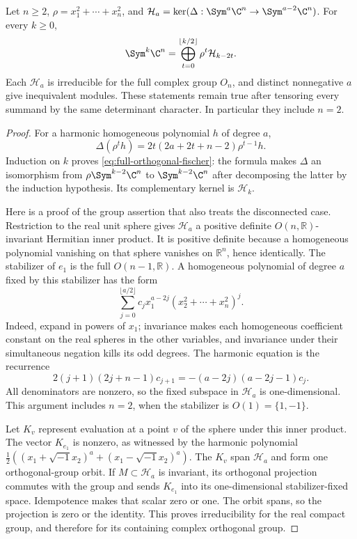 \begin{lemma}
\label{lem:full-orthogonal-harmonics}
Let \(n\ge2\), \(\rho=x_1^2+\cdots+x_n^2\), and
\(\mathcal H_a=\ker(\Delta:\Sym^a\C^n\to\Sym^{a-2}\C^n)\).
For every \(k\ge0\),
\begin{equation}\label{eq:full-orthogonal-fischer}
 \Sym^k\C^n=\bigoplus_{t=0}^{\lfloor k/2\rfloor}
                  \rho^t\mathcal H_{k-2t}.
\end{equation}
Each \(\mathcal H_a\) is irreducible for the full complex group
\(O_n\), and distinct nonnegative \(a\) give inequivalent modules.
These statements remain true after tensoring every summand by the
same determinant character.  In particular they include \(n=2\).
\end{lemma}
\begin{proof}
For a harmonic homogeneous polynomial \(h\) of degree \(a\),
\[
 \Delta(\rho^t h)=2t(2a+2t+n-2)\rho^{t-1}h.
\]
Induction on \(k\) proves \eqref{eq:full-orthogonal-fischer}:
the formula makes \(\Delta\) an isomorphism from
\(\rho\Sym^{k-2}\C^n\) to \(\Sym^{k-2}\C^n\) after decomposing
the latter by the induction hypothesis.  Its complementary kernel
is \(\mathcal H_k\).

Here is a proof of the group assertion that also treats the disconnected
case.  Restriction to the real unit sphere gives \(\mathcal H_a\) a
positive definite \(O(n,\mathbb R)\)-invariant Hermitian inner product.
It is positive definite because a homogeneous polynomial vanishing
on that sphere vanishes on \(\mathbb R^n\), hence identically.
The stabilizer of \(e_1\) is the full \(O(n-1,\mathbb R)\).
A homogeneous polynomial of degree \(a\) fixed by this stabilizer
has the form
\[
 \sum_{j=0}^{\lfloor a/2\rfloor}
 c_jx_1^{a-2j}(x_2^2+\cdots+x_n^2)^j.
\]
Indeed, expand in powers of \(x_1\); invariance makes each
homogeneous coefficient constant on the real spheres in the other
variables, and invariance under their simultaneous negation kills
its odd degrees.  The harmonic equation is the recurrence
\[
 2(j+1)(2j+n-1)c_{j+1}
       =-(a-2j)(a-2j-1)c_j.
\]
All denominators are nonzero, so the fixed subspace in
\(\mathcal H_a\) is one-dimensional.  This argument includes
\(n=2\), when the stabilizer is \(O(1)=\{1,-1\}\).

Let \(K_v\) represent evaluation at a point \(v\) of the sphere
under this inner product.  The vector \(K_{e_1}\) is nonzero,
as witnessed by the harmonic polynomial
\(\tfrac12((x_1+\sqrt{-1}x_2)^a+(x_1-\sqrt{-1}x_2)^a)\).
The \(K_v\) span \(\mathcal H_a\) and form one orthogonal-group
orbit.  If \(M\subset\mathcal H_a\) is invariant, its orthogonal
projection commutes with the group and sends \(K_{e_1}\) into its
one-dimensional stabilizer-fixed space.  Idempotence makes that
scalar zero or one.  The orbit spans, so the projection is zero or
the identity.  This proves irreducibility for the real compact group,
and therefore for its containing complex orthogonal group.


\end{proof}

